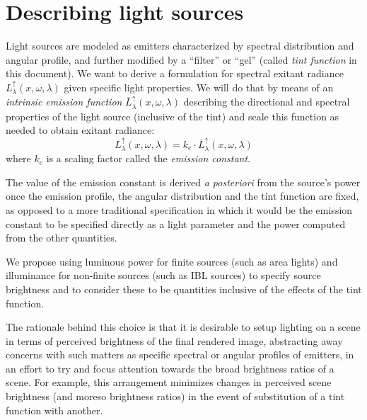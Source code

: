 
\section{Describing light sources}\label{ch:specification}

Light sources are modeled as emitters characterized by spectral distribution
and angular profile, and further modified by a ``filter'' or ``gel'' (called
\textsl{tint function} in this document). We want to derive a formulation for
spectral exitant radiance $L_{\lambda}^\uparrow(x,\omega,\lambda)$ given
specific light properties. We will do that by means of an \textsl{intrinsic
emission function} $\overline{L}^\uparrow_{\lambda}(x,\omega,\lambda)$
describing the directional and spectral properties of the light source
(inclusive of the tint) and scale this function as needed to obtain exitant
radiance:
\begin{equation}
L_{\lambda}^\uparrow(x, \omega, \lambda) = k_e \cdot
\overline{L}^\uparrow_{\lambda}(x, \omega, \lambda)
\end{equation}
where $k_e$ is a scaling factor called the \textsl{emission constant}.


The value of the emission constant is derived \emph{a posteriori} from the
source's power once the emission profile, the angular distribution and the tint
function are fixed, as opposed to a more traditional specification in which it
would be the emission constant to be specified directly as a light parameter and
the power computed from the other quantities.

We propose using luminous power for finite
sources (such as area lights) and illuminance for non-finite sources (such as
\gls{IBL} sources) to specify source brightness and to consider these to be
quantities inclusive of the effects of the tint function.

The rationale behind this choice is that it is desirable to setup lighting
on a scene in terms of perceived brightness of the final rendered image,
abstracting away concerns with such matters as specific spectral or angular
profiles of emitters, in an effort to try and focus attention towards the broad
brightness ratios of a scene.
For example, this arrangement minimizes changes in perceived scene brightness
(and moreso brightness ratios) in the event of substitution of a tint function
with another.

